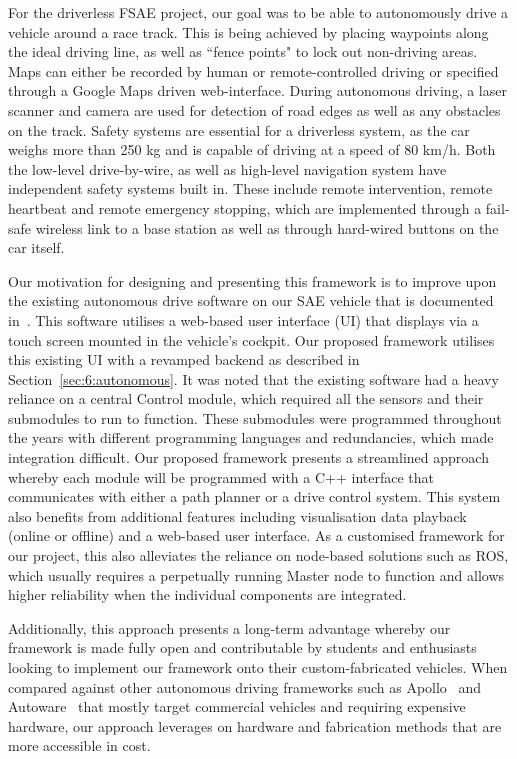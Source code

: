 For the driverless FSAE project, our goal was to be able to autonomously drive a vehicle around a race track. This is being achieved by placing waypoints along the ideal driving line, as well as ``fence points" to lock out non-driving areas. Maps can either be recorded by human or remote-controlled driving or specified through a Google Maps driven web-interface. During autonomous driving, a laser scanner and camera are used for detection of road edges as well as any obstacles on the track. Safety systems are essential for a driverless system, as the car weighs more than 250 kg and is capable of driving at a speed of 80 km/h. Both the low-level drive-by-wire, as well as high-level navigation system have independent safety systems built in. These include remote intervention, remote heartbeat and remote emergency stopping, which are implemented through a fail-safe wireless link to a base station as well as through hard-wired buttons on the car itself. 


Our motivation for designing and presenting this framework is to improve upon the existing autonomous drive software on our SAE vehicle that is documented in~\cite{drage_development_2013}. This software utilises a web-based user interface (UI) that displays via a touch screen mounted in the vehicle’s cockpit. Our proposed framework utilises this existing UI with a revamped backend as described in Section~\ref{sec:6:autonomous}. It was noted that the existing software had a heavy reliance on a central Control module, which required all the sensors and their submodules to run to function. These submodules were programmed throughout the years with different programming languages and redundancies, which made integration difficult. Our proposed framework presents a streamlined approach whereby each module will be programmed with a C++ interface that communicates with either a path planner or a drive control system. This system also benefits from additional features including visualisation data playback (online or offline) and a web-based user interface. As a customised framework for our project, this also alleviates the reliance on node-based solutions such as ROS, which usually requires a perpetually running Master node to function and allows higher reliability when the individual components are integrated.


Additionally, this approach presents a long-term advantage whereby our framework is made fully open and contributable by students and enthusiasts looking to implement our framework onto their custom-fabricated vehicles. When compared against other autonomous driving frameworks such as Apollo~\cite{baidu_apollo_nodate} and Autoware~\cite{autoware_autoware_nodate} that mostly target commercial vehicles and requiring expensive hardware, our approach leverages on hardware and fabrication methods that are more accessible in cost.

